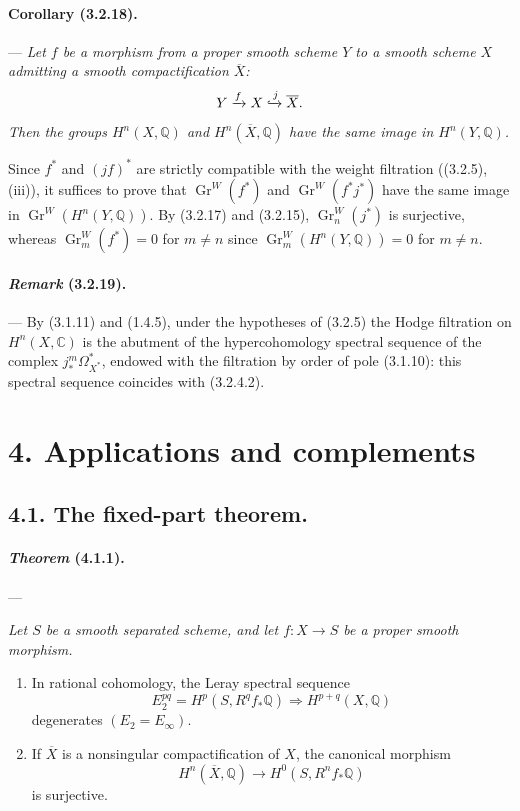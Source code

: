 \documentclass[10pt]{article}
\newcommand{\C}{\mathbb C}
\newcommand{\Q}{\mathbb Q}
\newcommand{\Gr}{\operatorname{Gr}}
\begin{document}
\paragraph{Corollary (3.2.18).} --- {\itshape Let $f$ be a morphism from a proper smooth scheme $Y$ to a smooth scheme $X$ admitting a smooth compactification $\overline X$:
\[
Y\xrightarrow{f}X\xhookrightarrow{j}\overline X.
\]
Then the groups $H^n(X,\Q)$ and $H^n(\overline X,\Q)$ have the same image in $H^n(Y,\Q)$.}

Since $f^*$ and $(jf)^*$ are strictly compatible with the weight filtration ((3.2.5), (iii)), it suffices to prove that $\Gr^W(f^*)$ and $\Gr^W(f^*j^*)$ have the same image in $\Gr^W(H^n(Y,\Q))$. By (3.2.17) and (3.2.15), $\Gr_n^W(j^*)$ is surjective, whereas $\Gr_m^W(f^*)=0$ for $m\ne n$ since $\Gr_m^W(H^n(Y,\Q))=0$ for $m\ne n$.

\paragraph{\emph{Remark} (3.2.19).} --- By (3.1.11) and (1.4.5), under the hypotheses of (3.2.5) the Hodge filtration on $H^n(X,\C)$ is the abutment of the hypercohomology spectral sequence of the complex $j_*^m\Omega_{X^*}^{*}$, endowed with the filtration by order of pole (3.1.10): this spectral sequence coincides with (3.2.4.2).

\section*{4. Applications and complements}

\subsection*{4.1. The fixed-part theorem.}

\paragraph{\emph{Theorem} (4.1.1).} --- {\itshape Let $S$ be a smooth separated scheme, and let $f:X\to S$ be a proper smooth morphism.
\begin{enumerate}[label=(\roman*),font=\itshape]
\item In rational cohomology, the Leray spectral sequence
\[
E_2^{pq}=H^p(S,R^qf_*\Q)\Longrightarrow H^{p+q}(X,\Q)
\]
degenerates $(E_2=E_\infty)$.
\item If $\overline X$ is a nonsingular compactification of $X$, the canonical morphism
\[
H^n(\overline X,\Q)\longrightarrow H^0(S,R^nf_*\Q)
\]
is surjective.
\end{enumerate}}
\end{document}
